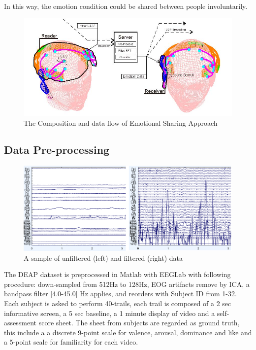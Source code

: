 \documentclass[a4paper]{article}
\begin{document}
In this way, the emotion condition could be shared between people involuntarily.

\begin{figure}
	\centering
	\includegraphics[width=\linewidth]{Diagram_2}
	\caption{The Composition and data flow of Emotional Sharing Approach}
	\label{fig:Lietome}
\end{figure}

\subsection{Data Pre-processing}

\begin{figure}
	\centering
	\includegraphics[width=0.8\linewidth]{Deap_Preprocess}
	\caption{A sample of unfiltered (left) and filtered (right) data}
	\label{fig:filter}
\end{figure}

The DEAP dataset\autocite{koelstra2012deap} is preprocessed in Matlab with EEGLab with following procedure: down-sampled from 512Hz to 128Hz, EOG artifacts remove by ICA, a bandpass filter [4.0-45.0] Hz applies, and reorders with Subject ID from 1-32. Each subject is asked to perform 40-trails, each trail is composed of a 2 sec informative screen, a 5 sec baseline, a 1 minute display of video and a self-assessment score sheet. The sheet from subjects are regarded as ground truth, this include a a discrete 9-point scale for valence, arousal, dominance and like and a 5-point scale for familiarity for each video. 
\end{document}
